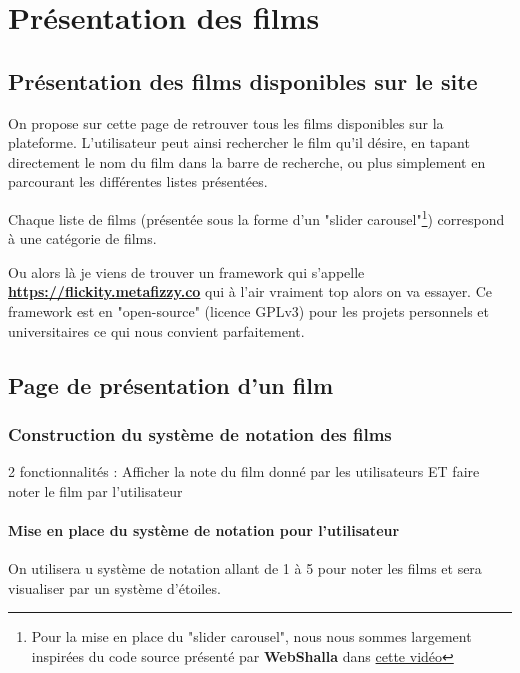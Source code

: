 \chapter{Présentation des films}


\section{Présentation des films disponibles sur le site}

            On propose sur cette page de retrouver tous les films disponibles sur la plateforme. L'utilisateur peut ainsi rechercher le film qu'il désire, en tapant directement le nom du film dans la barre de recherche, ou plus simplement en parcourant les différentes listes présentées.

            Chaque liste de films (présentée sous la forme d'un "slider carousel"\footnote{Pour la mise en place du "slider carousel", nous nous sommes largement inspirées du code source présenté par {\bfseries WebShalla} dans \href{https://www.youtube.com/watch?v=Gi4CTYOs7J4}{cette vidéo} }) correspond à une catégorie de films.

            Ou alors là je viens de trouver un framework qui s'appelle {\bfseries \href{Flickity}{https://flickity.metafizzy.co} } qui à l'air vraiment top alors on va essayer. Ce framework est en "open-source" (licence GPLv3) pour les projets personnels et universitaires ce qui nous convient parfaitement.


        \section{Page de présentation d'un film}

            \subsection{Construction du système de notation des films}
                2 fonctionnalités : Afficher la note du film donné par les utilisateurs ET faire noter le film par l'utilisateur

                \subsubsection{Mise en place du système de notation pour l'utilisateur}

                    On utilisera u système de notation allant de 1 à 5 pour noter les films et sera visualiser par un système d'étoiles.

